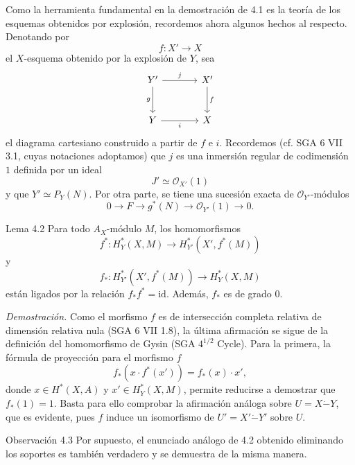 Como la herramienta fundamental en la demostración de 4.1 es la teoría de los esquemas obtenidos por explosión, recordemos ahora algunos hechos al respecto. Denotando por
\[
f:X'\to X
\]
el $X$-esquema obtenido por la explosión de $Y$, sea
\[
\begin{tikzcd}[column sep=large,row sep=large]
Y' \arrow[r,"j"] \arrow[d,"g"'] & X' \arrow[d,"f"]\\
Y \arrow[r,"i"'] & X
\end{tikzcd}
\]
el diagrama cartesiano construido a partir de $f$ e $i$. Recordemos (cf. SGA 6 VII 3.1, cuyas notaciones adoptamos) que $j$ es una inmersión regular de codimensión $1$ definida por un ideal
\[
J'\simeq\mathcal O_{X'}(1)
\]
y que $Y'\simeq P_Y(N)$. Por otra parte, se tiene una sucesión exacta de $\mathcal O_{Y'}$-módulos
\[
0\to F\to g^*(N)\to \mathcal O_{Y'}(1)\to0.
\]

\begin{statement}{Lema 4.2}
Para todo $A_X$-módulo $M$, los homomorfismos
\[
f^*:H_Y^*(X,M)\to H_{Y'}^*(X',f^*(M))
\]
y
\[
f_*:H_{Y'}^*(X',f^*(M))\to H_Y^*(X,M)
\]
están ligados por la relación $f_*f^*=\mathrm{id}$. Además, $f_*$ es de grado $0$.
\end{statement}

\emph{Demostración.} Como el morfismo $f$ es de intersección completa relativa de dimensión relativa nula (SGA 6 VII 1.8), la última afirmación se sigue de la definición del homomorfismo de Gysin (SGA $4^{1/2}$ Cycle). Para la primera, la fórmula de proyección para el morfismo $f$
\[
f_*(x\cdot f^*(x'))=f_*(x)\cdot x',
\]
donde $x\in H^*(X,A)$ y $x'\in H_Y^*(X,M)$, permite reducirse a demostrar que $f_*(1)=1$. Basta para ello comprobar la afirmación análoga sobre $U=X\mathbin{\dot{-}}Y$, que es evidente, pues $f$ induce un isomorfismo de $U'=X'\mathbin{\dot{-}}Y'$ sobre $U$.

\begin{statement}{Observación 4.3}
Por supuesto, el enunciado análogo de 4.2 obtenido eliminando los soportes es también verdadero y se demuestra de la misma manera.
\end{statement}
